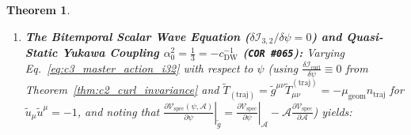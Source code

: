 \documentclass[11pt,a4paper]{article}
\newcommand{\catD}{\text{\textbf{\textcolor{blue!75!black}{[D]}}}}
\theoremstyle{definition}
\theoremstyle{plain}
\newtheorem{theorem}[axiom]{Theorem}
\theoremstyle{remark}
\begin{document}
\begin{theorem}
\begin{enumerate}[label=(\roman*)]
\begin{equation}
\begin{aligned}
    \end{aligned}
  \end{equation}
  In adapted coordinates $\Theta^{(1)} = x^1$ on a diagonal metric ($\mathcal{A} = (-e^\psi\tilde{g}^{11})^{-1} = -1/g^{11}$), raising one index with $\tilde{g}^{\mu 1}$ gives the mixed potential stress-energy components with exact Hilbert weights $(c_V, c_{\mathrm{kh}}) = (-2, -2)$ (\texttt{COR~\#081}):
  \begin{align}
  \tilde{T}^1_{\;1(\mathcal{V})} &= \frac{1}{2}\,c_V\,\mathcal{V}_{\mathrm{spec}}(\psi, \mathcal{A}) + c_{\mathrm{kh}}\,\mathcal{A}\,\frac{\partial\mathcal{V}_{\mathrm{spec}}(\psi, \mathcal{A})}{\partial\mathcal{A}}
  = -\mathcal{V}_{\mathrm{spec}} - 2\,\mathcal{A}\,\frac{\partial\mathcal{V}_{\mathrm{spec}}}{\partial\mathcal{A}}, \nonumber \\[3pt]
  \tilde{T}^i_{\;j(\mathcal{V})} &= -\mathcal{V}_{\mathrm{spec}}\,\delta^i_{\;j} \;\;\catD. \label{eq:c3_hilbert_stress_weights}
  \end{align}
  Furthermore, on any static diagonal metric ($g_{11} = -A(r)$, $g_{rr} = B(r)$, $G^1_{\;r} \equiv 0$) with a general stationary foliation ansatz $\Theta^{(1)}(x^1, r) = x^1 + h(r)$, the covariant off-diagonal khronon stress $T_{1r} = c_{\mathrm{kh,cov}}\,\mathcal{A}(r)^2\frac{\partial\mathcal{V}_{\mathrm{spec}}}{\partial\mathcal{A}}\,e^\psi\,h'(r)$ ($c_{\mathrm{kh,cov}} = +2$) raised with $\tilde{g}^{11}$ gives $G^1_{\;r} = T^1_{\;r} = -\frac{2}{N(r)^2}\mathcal{A}(r)^2\frac{\partial\mathcal{V}_{\mathrm{spec}}}{\partial\mathcal{A}}\,e^\psi\,h'(r) = 0$, which uniquely forces $h'(r) \equiv 0$ ($\Theta^{(1)} = x^1$, $\mathcal{A}(r) = A(r)$) wherever $\frac{\partial\mathcal{V}_{\mathrm{spec}}}{\partial\mathcal{A}} \neq 0$ (\texttt{COR~\#082}) \catD.
  \item \textbf{The Bitemporal Scalar Wave Equation ($\delta\mathcal{I}_{3,2}/\delta\psi = 0$) and Quasi-Static Yukawa Coupling $\alpha_0^2 = \frac{1}{3} = -c_{\mathrm{DW}}^{-1}$ (\texttt{COR~\#065}):}
  Varying Eq.~\eqref{eq:c3_master_action_i32} with respect to $\psi$ (using $\frac{\delta\mathcal{I}_{\mathrm{curl}}}{\delta\psi} \equiv 0$ from Theorem~\ref{thm:c2_curl_invariance} and $\tilde{T}_{(\mathrm{traj})} = \tilde{g}^{\mu\nu}\tilde{T}_{\mu\nu}^{(\mathrm{traj})} = -\mu_{\mathrm{geom}}n_{\mathrm{traj}}$ for $\tilde{u}_\mu\tilde{u}^\mu = -1$, and noting that $\left.\frac{\partial\mathcal{V}_{\mathrm{spec}}(\psi, \mathcal{A})}{\partial\psi}\right|_{\tilde{g}} = \left.\frac{\partial\mathcal{V}_{\mathrm{spec}}}{\partial\psi}\right|_{\mathcal{A}} - \mathcal{A}\frac{\partial\mathcal{V}_{\mathrm{spec}}}{\partial\mathcal{A}}$) yields:

\end{enumerate}
\end{theorem}
\end{document}
